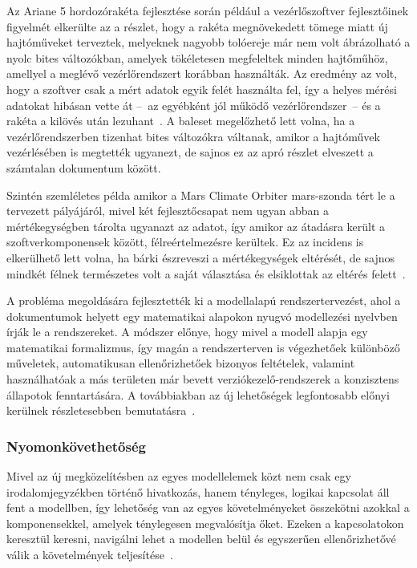         Az Ariane 5 hordozórakéta fejlesztése során például a vezérlőszoftver fejlesztőinek figyelmét elkerülte az a részlet, hogy a rakéta megnövekedett tömege miatt új hajtóműveket terveztek, melyeknek nagyobb tolóereje már nem volt ábrázolható a nyolc bites változókban, amelyek tökéletesen megfeleltek minden hajtőműhöz, amellyel a meglévő vezérlőrendszert korábban használták.
        Az eredmény az volt, hogy a szoftver csak a mért adatok egyik felét használta fel, így a helyes mérési adatokat hibásan vette át --~az egyébként jól működő vezérlőrendszer~-- és a rakéta a kilövés után lezuhant~\cite{Arinane5_1996}.
        A baleset megelőzhető lett volna, ha a vezérlőrendszerben tizenhat bites változókra váltanak, amikor a hajtóművek vezérlésében is megtették ugyanezt, de sajnos ez az apró részlet elveszett a számtalan dokumentum között.
        
        Szintén szemléletes példa amikor a Mars Climate Orbiter mars-szonda tért le a tervezett pályájáról, mivel két fejlesztőcsapat nem ugyan abban a mértékegységben tárolta ugyanazt az adatot, így amikor az átadásra került a szoftverkomponensek között, félreértelmezésre kerültek. Ez az incidens is elkerülhető lett volna, ha bárki észreveszi a mértékegységek eltérését, de sajnos mindkét félnek természetes volt a saját választása és elsiklottak az eltérés felett~\cite{MCO2009}.

        A probléma megoldására fejlesztették ki a modellalapú rendszertervezést, ahol a dokumentumok helyett egy matematikai alapokon nyugvó modellezési nyelvben írják le a rendszereket. A módszer előnye, hogy mivel a modell alapja egy matematikai formalizmus, így magán a rendszerterven is végezhetőek különböző műveletek, automatikusan ellenőrizhetőek bizonyos feltételek, valamint használhatóak a más területen már bevett verziókezelő-rendszerek a konzisztens állapotok fenntartására.
        A továbbiakban az új lehetőségek legfontosabb előnyi kerülnek részletesebben bemutatásra~\cite{Madni_2018}.
        
        \subsubsection{Nyomonkövethetőség}
        Mivel az új megközelítésben az egyes modellelemek közt nem csak egy irodalomjegyzékben történő hivatkozás, hanem tényleges, logikai kapcsolat áll fent a modellben, így lehetőség van az egyes követelményeket összekötni azokkal a komponensekkel, amelyek ténylegesen megvalósítja őket\cite{Madni_2018}. Ezeken a kapcsolatokon keresztül keresni, navigálni lehet a modellen belül és egyszerűen ellenőrizhetővé válik a követelmények teljesítése~\cite{Bajaj_2022}.
        
